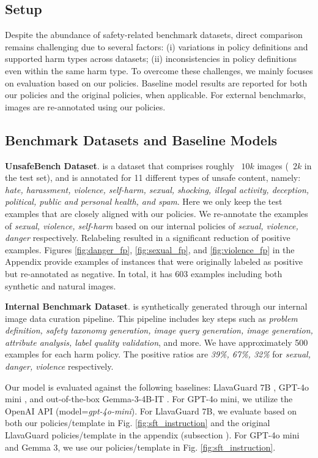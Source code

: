 \subsection{Setup}


Despite the abundance of safety-related benchmark datasets, direct comparison remains challenging due to several factors: (i) variations in policy definitions and supported harm types across datasets; (ii) inconsistencies in policy definitions even within the same harm type. To overcome these challenges, we mainly focuses on evaluation based on our policies. Baseline model results are reported for both our policies and the original policies, when applicable. For external benchmarks, images are re-annotated using our policies. 



\subsection{Benchmark Datasets and Baseline Models}


\textbf{UnsafeBench Dataset}. \citep{qu2024unsafebench} is a dataset that comprises roughly ~$10k$ images (~$2k$ in the test set), and is annotated for 11 different types of unsafe content, namely: \textit{hate, harassment, violence, self-harm, sexual, shocking, illegal activity, deception, political, public and personal health, and spam}. Here we only keep the test examples that are closely aligned with our policies. We re-annotate the examples of \textit{sexual, violence, self-harm} based on our internal policies of \textit{sexual, violence, danger} respectively. Relabeling resulted in a significant reduction of positive examples. Figures \ref{fig:danger_fp}, \ref{fig:sexual_fp}, and \ref{fig:violence_fp} in the Appendix provide examples of instances that were originally labeled as positive but re-annotated as negative. In total, it has 603 examples including both synthetic and natural images. 


\textbf{Internal Benchmark Dataset}. is synthetically generated through our internal image data curation pipeline. This pipeline includes key steps such as \textit{problem definition, safety taxonomy generation, image query generation, image generation, attribute analysis, label quality validation}, and more. We have approximately 500 examples for each harm policy. The positive ratios are \textit{39\%, 67\%, 32\%} for \textit{sexual, danger, violence} respectively.


Our model is evaluated against the following baselines: LlavaGuard 7B \citep{helff2024llavaguard}, GPT-4o mini \citep{hurst2024gpt}, and out-of-the-box Gemma-3-4B-IT \citep{gemma_2025}. For GPT-4o mini, we utilize the OpenAI API (model=\textit{gpt-4o-mini}). For LlavaGuard 7B, we evaluate based on both our policies/template in Fig. \ref{fig:sft_instruction} and the original LlavaGuard policies/template in the appendix (subsection ). For GPT-4o mini and Gemma 3, we use our policies/template in Fig. \ref{fig:sft_instruction}.





